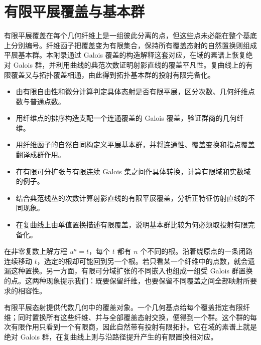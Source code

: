 
\chapter{有限平展覆盖与基本群}
\label{b3:app:I}

\begin{chapterabstract}
	有限平展覆盖在每个几何纤维上是一组彼此分离的点，但这些点未必能在整个基底上分别编号。纤维函子把覆盖变为有限集合，保持所有覆盖态射的自然置换则组成平展基本群。本附录通过 Galois 覆盖的构造解释这套对应，在域的素谱上恢复绝对 Galois 群，并利用曲线的典范次数证明射影直线的覆盖平凡性。复曲线上的有限覆盖又与拓扑覆盖相通，由此得到拓扑基本群的投射有限完备化。
\end{chapterabstract}

\begin{learninggoals}
	\begin{itemize}
		\item 由有限自由性和微分计算判定具体态射是否有限平展，区分次数、几何纤维点数与普通点数。
		\item 用纤维点的排序构造支配一个连通覆盖的 Galois 覆盖，验证群商的几何纤维。
		\item 用纤维函子的自然自同构定义平展基本群，并将连通性、覆盖变换和指点覆盖翻译成群作用。
		\item 在有限可分扩张与有限连续 Galois 集之间作具体转换，计算有限域和实数域的例子。
		\item 结合典范线丛的次数计算射影直线的有限平展覆盖，分析正特征仿射直线的不同现象。
		\item 在复曲线上由单值置换描述有限覆盖，说明基本群比较为何必须取投射有限完备化。
	\end{itemize}
\end{learninggoals}

在非零复数上解方程 \(u^n=t\)，每个 \(t\) 都有 \(n\) 个不同的根。沿着绕原点的一条闭路连续移动 \(t\)，选定的根却可能回到另一个根。若只看某一个纤维中的点数，就会遗漏这种置换。另一方面，有限可分域扩张的不同嵌入也组成一组受 Galois 群置换的点。这两种现象提示我们：既要保留纤维，也要保留不同覆盖之间全部映射所要求的相容性。

\ProseParagraphBreak
有限平展态射提供代数几何中的覆盖对象。一个几何基点给每个覆盖指定有限纤维；同时置换所有这些纤维、并与全部覆盖态射交换，便得到一个群。这个群的每次有限作用只看到一个有限商，因此自然带有投射有限拓扑。它在域的素谱上就是绝对 Galois 群，在复曲线上则与沿路径提升产生的有限置换相对应。

